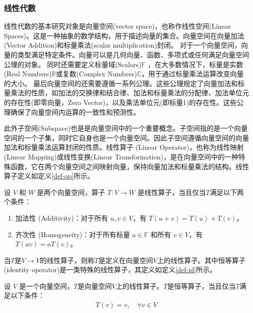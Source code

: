 \subsubsection*{线性代数}
线性代数的基本研究对象是向量空间(vector space)，也称作线性空间(Linear Spaces)。这是一种抽象的数学结构，用于描述向量的集合。向量空间在向量加法(Vector Addition)和标量乘法(scalar multiplication)封闭\cite{greub2012linear}。
对于一个向量空间，向量的类型满足特定条件。向量可以是几何向量、函数、多项式或任何满足向量空间公理的对象。
同时还需要定义标量域(Scalars)\(\mathbb{F}\) ，在大多数情况下，标量是实数(Real Numbers)\(\mathbb{R}\)或复数(Complex Numbers)\(\mathbb{C}\)，用于通过标量乘法运算改变向量的大小。
最后向量空间的还需要遵循一系列公理。这些公理规定了向量加法和标量乘法的性质，如加法的交换律和结合律、加法和标量乘法的分配律、加法单位元的存在性(即零向量，Zero Vector)，以及乘法单位元(即标量1)的存在性。这些公理确保了向量空间内运算的一致性和预测性。

此外子空间(Subspace)也是是向量空间中的一个重要概念。子空间指的是一个向量空间的一个子集，同时它自身也是一个向量空间。因此子空间遵循向量空间的向量加法和标量乘法运算封闭的性质。线性算子 (Linear Operator)，也称为线性映射(Linear Mapping)或线性变换(Linear Transformation)，是在向量空间中的一种特殊函数，它在两个向量空间之间映射向量，保持向量加法和标量乘法的结构。线性算子定义如定义\ref{def-op}所示。%
\begin{definition}\citep{greub2012linear}
    \label{def-op}
    设 \(V\) 和 \(W\) 是两个向量空间，算子 \(T: V \rightarrow W\) 是线性算子，当且仅当\(T\)满足以下两个条件：
\begin{enumerate}
    \item 加法性 (Additivity)：对于所有 \(u, v \in V\)，有 \(T(u + v) = T(u) + T(v)\)。
    \item 齐次性 (Homogeneity)：对于所有标量 \(a \in \mathbb{F}\) 和所有 \(v \in V\)，有 \(T(av) = aT(v)\)。
\end{enumerate}
\end{definition}

当$T$是\(V \rightarrow V\)的线性算子，则称$T$是定义在向量空间$V$上的线性算子。其中恒等算子(identity operator)是一类特殊的线性算子，其定义如定义\ref{def-id}所示。
\begin{definition}\citep{greub2012linear}
    \label{def-id}
    设 \(V\) 是一个向量空间，$T$是向量空间$V$上的线性算子。$T$是恒等算子，当且仅当$T$满足以下条件：
    \begin{align}
        T(v) = v,\quad \forall v \in V
    \end{align}
\end{definition}


